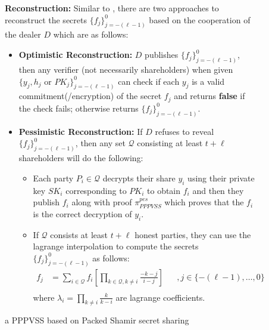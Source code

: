 \begin{figure}[ht]
{\begin{tcolorbox}[title=\textbf{a PPPVSS based on Packed Shamir secret sharing \ref{sec:packed-shamir}}, width=1.2\textwidth, colframe=blue!75!black, colback=blue!10, sharp corners]
        \vspace{0.5em}
        \textbf{Reconstruction:}
            Similar to \cite{cryptoeprint:2025/576}, there are two approaches to reconstruct the secrets 
            $\{f_j\}_{j=-(\ell-1)}^0$ based on the cooperation of the dealer $D$ which are as follows:
            \begin{itemize}
                \item \textbf{Optimistic Reconstruction:} $D$ publishes $\{f_j\}_{j=-(\ell-1)}^0$, then any verifier (not necessarily shareholders) 
                when given $\{y_j,h_j\text{ or }PK_j\}_{j=-(\ell-1)}^0$ can check if each $y_j$ is a valid commitment(/encryption) 
                of the secret $f_j$ and returns \textbf{false} if the check fails; otherwise returns 
                $\{f_j\}_{j=-(\ell-1)}^0$.
                \item \textbf{Pessimistic Reconstruction:} If $D$ refuses to reveal $\{f_j\}_{j=-(\ell-1)}^0$, then any set 
                $\mathcal{Q}$ consisting at least $t+\ell$ shareholders will do the following:
                \begin{itemize}
                    \item Each party $P_i\in\mathcal{Q}$ decrypts their share $y_i$ using their private key $SK_i$ 
                      corresponding to $PK_i$ to obtain $f_i$ and then they publish $f_i$ 
                      along with proof $\pi_{PPPVSS}^{pes}$ which proves that the $f_i$ is the correct 
                      decryption of $y_i$.
                    \item If $\mathcal{Q}$ consists at least $t+\ell$ honest parties, they can use the 
                    lagrange interpolation to compute the secrets $\{f_j\}_{j=-(\ell-1)}^0$ as follows:
                    \begin{align*}
                        f_j &= \sum_{i\in \mathcal{Q}} f_i \left[\prod_{k\in \mathcal{Q}, k\neq i}\frac{-k-j}{i-j}\right] &&, j\in\{-(\ell-1),\dots,0\} \\
                    \end{align*}
                    where $\lambda_i=\prod_{k\neq i}\frac{k}{k-i}$ are lagrange coefficients.
                \end{itemize}
            \end{itemize}
    \end{tcolorbox}
    }
    \caption[PPPVSS Scheme]{a PPPVSS based on Packed Shamir secret sharing}
    \label{fig:version-packed-shamir-PPPVSS}
\end{figure}